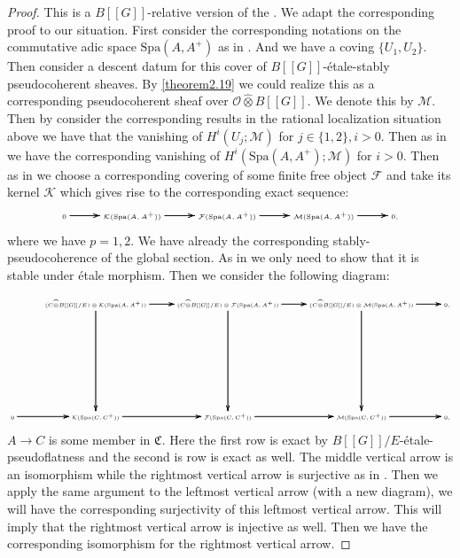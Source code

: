 \documentclass[12pt]{amsart}
\theoremstyle{definition}
\numberwithin{equation}{section}
\begin{document}
\begin{proof}
This is a $B[[G]]$-relative version of the \cite[Lemma 2.5.13]{KL2}. We adapt the corresponding proof to our situation. First consider the corresponding notations on the commutative adic space $\mathrm{Spa}(A,A^+)$ as in \cite[Lemma 2.4.10]{KL2}. And we have a coving $\{U_1,U_2\}$. Then consider a descent datum for this cover of $B[[G]]$-\'etale-stably pseudocoherent sheaves. By \cref{theorem2.19} we could realize this as a corresponding pseudocoherent sheaf over $\mathcal{O}\widehat{\otimes}B[[G]]$. We denote this by $\mathcal{M}$. Then by consider the corresponding results in the rational localization situation above we have that the vanishing of $H^i(U_j;\mathcal{M})$ for $j\in \{1,2\},i>0$. Then as in \cite[Lemma 2.5.13]{KL2} we have the corresponding vanishing of $H^i(\mathrm{Spa}(A,A^+);\mathcal{M})$ for $i>0$. Then as in \cite[Lemma 2.5.13]{KL2} we choose a corresponding covering of some finite free object $\mathcal{F}$ and take its kernel $\mathcal{K}$ which gives rise to the corresponding exact sequence:
\[\tiny
\xymatrix@C+0pc@R+6pc{
0 \ar[r]\ar[r]\ar[r] &\mathcal{K}(\mathrm{Spa}(A,A^+))   \ar[r]\ar[r]\ar[r] &\mathcal{F}(\mathrm{Spa}(A,A^+)) \ar[r]\ar[r]\ar[r] & \mathcal{M}(\mathrm{Spa}(A,A^+)) \ar[r]\ar[r]\ar[r] &0,
}
\]
where we have $p=1,2$. We have already the corresponding stably-pseudocoherence of the global section. As in \cite[Lemma 2.5.13]{KL2} we only need to show that it is stable under \'etale morphism. Then we consider the following diagram:

\[ \tiny
\xymatrix@C+0pc@R+6pc{
 &(C\widehat{\otimes}B[[G]]/E)\otimes\mathcal{K}(\mathrm{Spa}(A,A^+))   \ar[r]\ar[r]\ar[r] \ar[d]\ar[d]\ar[d] &(C\widehat{\otimes}B[[G]]/E)\otimes\mathcal{F}(\mathrm{Spa}(A,A^+)) \ar[r]\ar[r]\ar[r] \ar[d]\ar[d]\ar[d] & (C\widehat{\otimes}B[[G]]/E)\otimes\mathcal{M}(\mathrm{Spa}(A,A^+))\ar[r]\ar[r]\ar[r]  \ar[d]\ar[d]\ar[d]&0,\\
0 \ar[r]\ar[r]\ar[r] &\mathcal{K}(\mathrm{Spa}(C,C^+))   \ar[r]\ar[r]\ar[r] &\mathcal{F}(\mathrm{Spa}(C,C^+)) \ar[r]\ar[r]\ar[r] & \mathcal{M}(\mathrm{Spa}(C,C^+)) \ar[r]\ar[r]\ar[r] &0,\\
}
\]
$A\rightarrow C$ is some member in $\mathfrak{C}$. Here the first row is exact by $B[[G]]/E$-\'etale-pseudoflatness and the second is row is exact as well. The middle vertical arrow is an isomorphism while the rightmost vertical arrow is surjective as in \cite[Lemma 2.5.13]{KL2}. Then we apply the same argument to the leftmost vertical arrow (with a new diagram), we will have the corresponding surjectivity of this leftmost vertical arrow. This will imply that the rightmost vertical arrow is injective as well. Then we have the corresponding isomorphism for the rightmost vertical arrow.
\end{proof}
\end{document}
